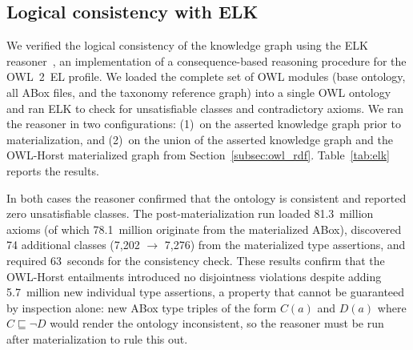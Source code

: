 \documentclass[11pt,a4paper]{article}
\begin{document}
\subsection{Logical consistency with ELK}

We verified the logical consistency of the knowledge graph using
the ELK reasoner~\cite{elk}, an implementation of a
consequence-based reasoning procedure for the OWL~2~EL profile. We
loaded the complete set of OWL modules (base ontology, all ABox
files, and the taxonomy reference graph) into a single OWL ontology
and ran ELK to check for unsatisfiable classes and contradictory
axioms. We ran the reasoner in two configurations: (1)~on the
asserted knowledge graph prior to materialization, and (2)~on the
union of the asserted knowledge graph and the OWL-Horst materialized
graph from Section~\ref{subsec:owl_rdf}.
Table~\ref{tab:elk} reports the results.

In both cases the reasoner confirmed that the ontology is
consistent and reported zero unsatisfiable classes. The
post-materialization run loaded 81.3~million axioms (of which
78.1~million originate from the materialized ABox), discovered 74
additional classes (7{,}202 $\rightarrow$ 7{,}276) from the
materialized type assertions, and required 63~seconds for the
consistency check. These results confirm that the OWL-Horst
entailments introduced no disjointness violations despite adding
5.7~million new individual type assertions, a property that
cannot be guaranteed by inspection alone: new ABox type triples of
the form \(C(a)\) and \(D(a)\) where \(C \sqsubseteq \neg D\) would
render the ontology inconsistent, so the reasoner must be run
after materialization to rule this out.
\end{document}
